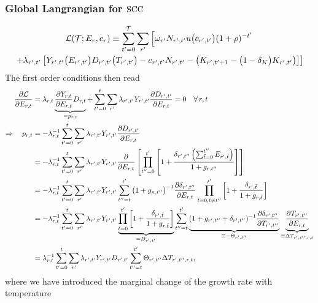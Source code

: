 \documentclass[preprint,3p,authoryear]{elsarticle}
\begin{document}
\subsubsection{Global Langrangian for $\operatorname{SCC}$}
\label{sec:Lglob}
\begin{multline}
  \label{eq:Lglob} \mathcal{L}(\mathcal{T};E_r,c_r)\equiv\sum_{t'=0}^{\mathcal{T}}\sum_{r'}\left[\omega_{r'}N_{r',t'}u\big(c_{r',t'}\big)(1+\rho)^{-t'}\right.\\
  \left.+\lambda_{r',t'}\left[Y_{r',t'}\big(E_{r',t'}\big)D_{r',t'}\big(T_{r',t'}\big) -c_{r',t'}N_{r',t'}-\left(K_{r',t'+1}-\big(1-\delta_K\big)K_{r',t'}\right) \right]\right]
\end{multline}
The first order conditions then read
\begin{align}
  \label{eq:partE}
  \frac{\partial\mathcal{L}}{\partial E_{r,t}} &= \lambda_{r,t}\underbrace{\frac{\partial Y_{r,t}}{\partial E_{r,t}}D_{r,t}}_{=p_{r,t}}+\sum_{t'=0}^{t}\sum_{r'}\lambda_{r',t'}Y_{r',t'}\frac{\partial D_{r',t'}}{\partial E_{r,t}}=0\quad\forall\,r,t\notag\\
  \Rightarrow \quad p_{r,t} &= -\lambda_{r,t}^{-1}\sum_{t'=0}^{t}\sum_{r'}\lambda_{r',t'}Y_{r',t'}\frac{\partial D_{r',t'}}{\partial E_{r,t}}\notag\\
                                              &= -\lambda_{r,t}^{-1}\sum_{t'=0}^{t}\sum_{r'}\lambda_{r',t'}Y_{r',t'}\frac{\partial }{\partial E_{r,t}}\left[\prod_{t''=0}^{t'}\left[1+\frac{\delta_{r',t''}\left(\sum_{\tilde{t}=0}^{t''}E_{r',\tilde{t}}\right)}{1+g_{r,t''}} \right] \right]\notag\\
                                         &=-\lambda_{r,t}^{-1}\sum_{t'=0}^{t}\sum_{r'}\lambda_{r',t'}Y_{r',t'} \sum_{t''=t}^{t'}\big(1+g_{n,t''}\big)^{-1}\frac{\partial\delta_{r',t''}}{\partial E_{r,t}}\prod_{\tilde{t}=0,\tilde{t}\neq t''}^{t'}\left[1+\frac{\delta_{r',\tilde{t}}}{1+g_{r,\tilde{t}}} \right]\notag\\
                                         &=-\lambda_{r,t}^{-1}\sum_{t'=0}^{t}\sum_{r'}\lambda_{r',t'}Y_{r',t'}\underbrace{\prod_{\tilde{t}=0}^{t'}\left[1+\frac{\delta_{r',\tilde{t}}}{1+g_{r,\tilde{t}}}\right]}_{=D_{r',t'}}\sum_{t''=t}^{t'}\underbrace{(1+g_{r',t''}+\delta_{r',t''})^{-1}\frac{\partial\delta_{r',t''}}{\partial T_{r',t''}}}_{\equiv -\Theta_{r',t''}}\underbrace{\frac{\partial T_{r',t''}}{\partial E_{r,t}}}_{\equiv\Delta T_{r',t'',r,t}}\notag\\
&= \lambda_{r,t}^{-1}\sum_{t'=0}^{t}\sum_{r'}\lambda_{r',t'}Y_{r',t'}D_{r',t'}\sum_{t''=t}^{t'}\Theta_{r',t''}\Delta T_{r',t'',r,t},  
\end{align}
where we have introduced the marginal change of the growth rate with temperature
\end{document}
